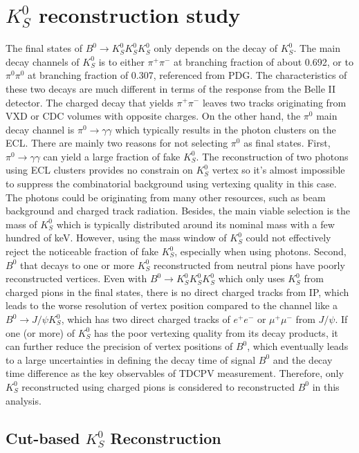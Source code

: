 \chapter{$K_S^0$ reconstruction study}

The final states of $B^0 \to K_S^0  K_S^0  K_S^0 $ only depends on the decay of $K_S^0$. The main decay channels of $K_S^0$ is to either $\pi^+ \pi^-$ at branching fraction of about 0.692, or to $\pi^0 \pi^0$ at branching fraction of 0.307, referenced from PDG\cite{pdg}.
 The characteristics of these two decays are much different in terms of the response from the Belle II detector. The charged decay that yields  $\pi^+ \pi^-$ leaves two tracks originating from VXD or CDC volumes with opposite charges. On the other hand, the $\pi^0$ main decay channel is $\pi^0 \to \gamma \gamma$ which typically results in the photon clusters on the ECL. There are mainly two reasons for not selecting $\pi^0$ as final states.
 First, $\pi^0 \to \gamma \gamma$ can yield a large fraction of fake $K_S^0$. The reconstruction of two photons using ECL clusters provides no constrain on $K_S^0$ vertex so it's almost impossible to suppress the combinatorial background using vertexing quality in this case. The photons could be originating from many other resources, such as beam background and charged track radiation. Besides, the main viable selection is the mass of $K_S^0$ which is typically distributed around its nominal mass with a few hundred of keV. However, using the mass window of $K_S^0$ could not effectively reject the noticeable fraction of fake $K_S^0$, especially when using photons. Second, $B^0$ that decays to one or more $K_S^0$ reconstructed from neutral pions have poorly reconstructed vertices. Even with $B^0 \to K_S^0  K_S^0  K_S^0 $ which only uses $K_S^0$ from charged pions in the final states, there is no direct charged tracks from IP, which leads to the worse resolution of vertex position compared to the channel like a $B^0 \to J/\psi K_S^0$, which has two direct charged tracks of $e^+e^-$ or $\mu^+ \mu^-$ from $J/\psi$. If one (or more) of $K^0_S$ has the poor vertexing quality from its decay products, it can further reduce the precision of vertex positions of $B^0$, which eventually leads to a large uncertainties in defining the decay time of signal $B^0$ and the decay time difference as the key observables of TDCPV measurement. Therefore, only $K_S^0$ reconstructed using charged pions is considered to reconstructed $B^0$ in this analysis.
 
 \section{Cut-based $K_S^0$ Reconstruction}
 
